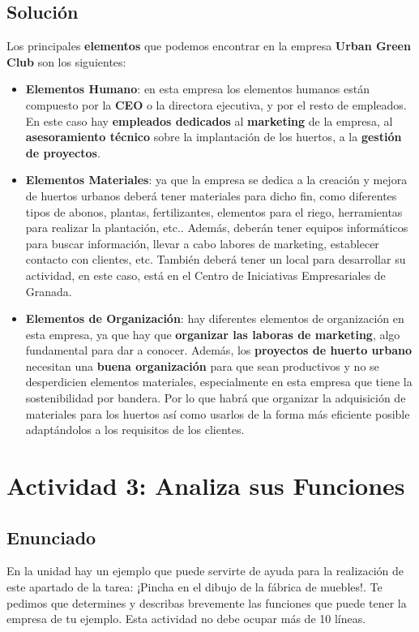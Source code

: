 \subsection{Solución}
Los principales \textbf{elementos} que podemos encontrar en la empresa \textbf{Urban Green Club} son los siguientes:

\begin{itemize}
    \item \textbf{Elementos Humano}: en esta empresa los elementos humanos están compuesto por la \textbf{CEO} o la directora ejecutiva, y por el resto de empleados. En este caso hay \textbf{empleados dedicados} al \textbf{marketing} de la empresa, al \textbf{asesoramiento técnico} sobre la implantación de los huertos, a la \textbf{gestión de proyectos}.

    \item \textbf{Elementos Materiales}: ya que la empresa se dedica a la creación y mejora de huertos urbanos deberá tener materiales para dicho fin, como diferentes tipos de abonos, plantas, fertilizantes, elementos para el riego, herramientas para realizar la plantación, etc.. Además, deberán tener equipos informáticos para buscar información, llevar a cabo labores de marketing, establecer contacto con clientes, etc. También deberá tener un local para desarrollar su actividad, en este caso, está en el Centro de Iniciativas Empresariales de Granada.

    \item \textbf{Elementos de Organización}: hay diferentes elementos de organización en esta empresa, ya que hay que \textbf{organizar las laboras de marketing}, algo fundamental para dar a conocer. Además, los \textbf{proyectos de huerto urbano} necesitan una \textbf{buena organización} para que sean productivos y no se desperdicien elementos materiales, especialmente en esta empresa que tiene la sostenibilidad por bandera. Por lo que habrá que organizar la adquisición de materiales para los huertos así como usarlos de la forma más eficiente posible adaptándolos a los requisitos de los clientes.
\end{itemize}

\section{Actividad 3: Analiza sus Funciones}
\subsection{Enunciado}
En la unidad hay un ejemplo que puede servirte de ayuda para la realización de este apartado de la tarea: ¡Pincha en el dibujo de la fábrica de muebles!.
Te pedimos que determines y describas brevemente las funciones que puede tener la empresa de tu ejemplo. Esta actividad no debe ocupar más de 10 líneas.

